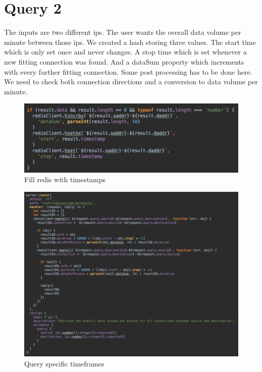 \section{Query 2}
The inputs are two different ips. The user wants the overall data volume per minute between those ips. We created a hash storing three values. The start time which is only set once and never changes. A stop time which is set whenever a new fitting connection was found. And a dataSum property which increments with every further fitting connection. Some post processing has to be done here. We need to check both connection directions and a conversion to data volume per minute.

  \begin{figure}[htb!]
	\centerline{\includegraphics[width=1.0\textwidth]{resources/solution2-4.png}}
	\caption{Fill redis with timestamps}
	\label{query2}
\end{figure}

\begin{figure}[htb!]
	\centerline{\includegraphics[width=1.0\textwidth]{resources/solution2-5.png}}
	\caption{Query specific timeframes}
	\label{query22}
\end{figure}

